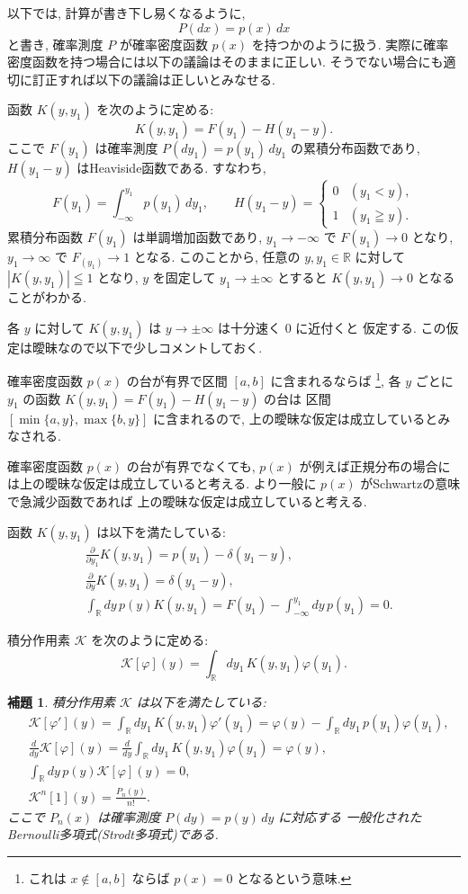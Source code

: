 \documentclass[12pt,twoside]{jarticle}
\newcommand\R{{\mathbb R}} %
\renewcommand\d{\partial}
\newcommand\PM{P} %
\newcommand\PDF{p} %
\newcommand\K{{\mathscr K}}
\theoremstyle{jplain}
\newtheorem{lemma}[theorem]{補題}
\theoremstyle{jplain}
\theoremstyle{jplain}
\numberwithin{theorem}{section}
\numberwithin{equation}{section}
\numberwithin{figure}{section}
\numberwithin{table}{section}
\begin{document}
以下では, 計算が書き下し易くなるように,
\[
\PM(dx) = \PDF(x)\,dx
\]
と書き, 確率測度 $\PM$ が確率密度函数 $\PDF(x)$ を持つかのように扱う.
実際に確率密度函数を持つ場合には以下の議論はそのままに正しい.
そうでない場合にも適切に訂正すれば以下の議論は正しいとみなせる.

函数 $K(y,y_1)$ を次のように定める:
\[
K(y,y_1) = F(y_1) - H(y_1-y).
\]
ここで $F(y_1)$ は確率測度 $\PM(dy_1)=\PDF(y_1)\,dy_1$ の累積分布函数であり,
$H(y_1-y)$ はHeaviside函数である. すなわち,
\[
F(y_1) = \int_{-\infty}^{y_1}\PDF(y_1)\,dy_1,
\qquad
H(y_1-y) = \begin{cases}
0 & (y_1<y), \\
1 & (y_1\geqq y).
\end{cases}
\]
累積分布函数 $F(y_1)$ は単調増加函数であり,
$y_1\to-\infty$ で $F(y_1)\to 0$ となり,
$y_1\to\infty$ で $F_(y_1)\to 1$ となる.
このことから, 任意の $y,y_1\in\R$ に対して $|K(y,y_1)|\leqq 1$ となり,
$y$ を固定して $y_1\to\pm\infty$ とすると $K(y,y_1)\to 0$ となる
ことがわかる.

各 $y$ に対して $K(y,y_1)$ は $y\to\pm\infty$ は十分速く $0$ に近付くと
仮定する. この仮定は曖昧なので以下で少しコメントしておく.

確率密度函数 $\PDF(x)$ の台が有界で区間 $[a,b]$ に含まれるならば%
\footnote{これは $x\not\in[a,b]$ ならば $\PDF(x)=0$ となるという意味.},
各 $y$ ごとに $y_1$ の函数 $K(y,y_1) = F(y_1)-H(y_1-y)$ の台は
区間 $[\min\{a,y\},\max\{b,y\}]$ に含まれるので,
上の曖昧な仮定は成立しているとみなされる.

確率密度函数 $\PDF(x)$ の台が有界でなくても,
$\PDF(x)$ が例えば正規分布の場合には上の曖昧な仮定は成立していると考える.
より一般に $\PDF(x)$ がSchwartzの意味で急減少函数であれば
上の曖昧な仮定は成立していると考える.

函数 $K(y,y_1)$ は以下を満たしている:
\begin{align*}
  &
  \frac\d{\d y_1}K(y,y_1) = \PDF(y_1) - \delta(y_1-y),
  \\ &
  \frac\d{\d y}K(y,y_1) = \delta(y_1-y),
  \\ &
  \int_\R dy\,\PDF(y)K(y,y_1)
  = F(y_1) - \int_{-\infty}^{y_1}dy\,\PDF(y_1)
  = 0.
\end{align*}

積分作用素 $\K$ を次のように定める:
\[
\K[\varphi](y) = \int_\R dy_1\,K(y,y_1)\varphi(y_1).
\]

\begin{lemma}
  \label{lemma:K}
  積分作用素 $\K$ は以下を満たしている:
  \begin{align*}
    &
    \K[\varphi'](y)
    = \int_\R dy_1\,K(y,y_1)\varphi'(y_1)
    = \varphi(y) - \int_\R dy_1\,\PDF(y_1)\varphi(y_1),
    \\ &
    \frac{d}{dy}\K[\varphi](y)
    = \frac{d}{dy}\int_\R dy_1\,K(y,y_1)\varphi(y_1)
    = \varphi(y),
    \\ &
    \int_\R dy\,\PDF(y)\K[\varphi](y) = 0,
    \\ &
    \K^n[1](y) = \frac{P_n(y)}{n!}.
  \end{align*}
  ここで $P_n(x)$ は確率測度 $\PM(dy)=\PDF(y)\,dy$ に対応する
  一般化されたBernoulli多項式(Strodt多項式)である.
\end{lemma}
\end{document}
